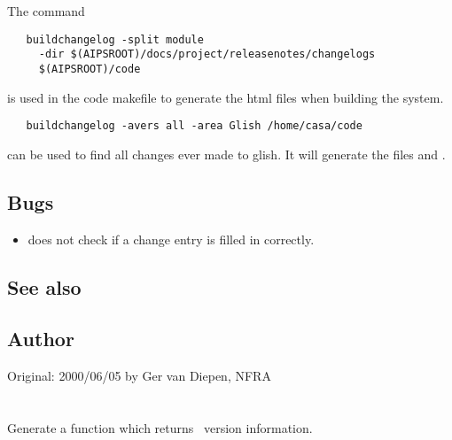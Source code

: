 The command

\begin{verbatim}
   buildchangelog -split module
     -dir $(AIPSROOT)/docs/project/releasenotes/changelogs
     $(AIPSROOT)/code
\end{verbatim}
\noindent
is used in the code makefile to generate the html files
when building the system.

\begin{verbatim}
   buildchangelog -avers all -area Glish /home/casa/code
\end{verbatim}
\noindent
can be used to find all changes ever made to glish.
It will generate the files  and
.

\subsection*{Bugs}

\begin{itemize}
\item
    does not check if a change entry is filled in
   correctly. 
\end{itemize}

\subsection*{See also}

\subsection*{Author}

Original: 2000/06/05 by Ger van Diepen, NFRA


\newpage
\section{}
\label{doover}
 
Generate a function which returns \aipspp\ version information.

\begin{synopsis}
\end{synopsis}
 
